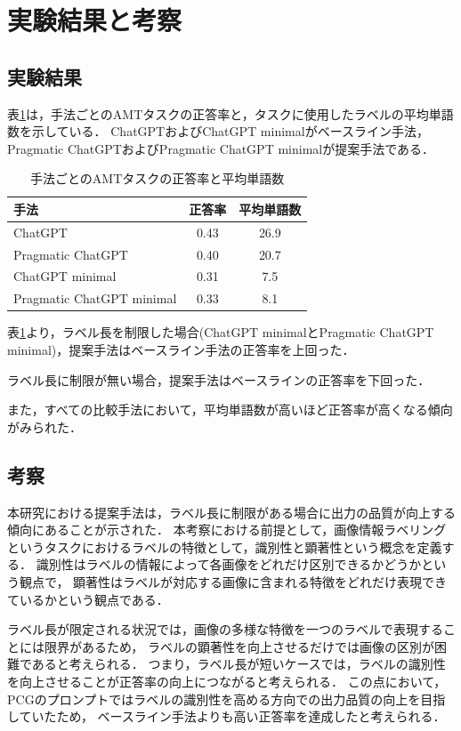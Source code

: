 \documentclass[a4paper,11pt]{jreport}
\begin{document}
\section{実験結果と考察}

\subsection{実験結果}

表\ref{tab:accuracy_result}は，手法ごとのAMTタスクの正答率と，タスクに使用したラベルの平均単語数を示している．
ChatGPTおよびChatGPT minimalがベースライン手法，Pragmatic ChatGPTおよびPragmatic ChatGPT minimalが提案手法である．

\begin{table}[H]
\centering
\begin{tabular}{lcc}
\hline
手法 & 正答率 & 平均単語数 \\
\hline
ChatGPT & 0.43 & 26.9 \\
Pragmatic ChatGPT & 0.40 & 20.7 \\
ChatGPT minimal & 0.31 & 7.5 \\
Pragmatic ChatGPT minimal & 0.33 & 8.1 \\
\hline
\end{tabular}
\caption{手法ごとのAMTタスクの正答率と平均単語数}
\label{tab:accuracy_result}
\end{table}

表\ref{tab:accuracy_result}より，ラベル長を制限した場合(ChatGPT minimalとPragmatic ChatGPT minimal)，提案手法はベースライン手法の正答率を上回った．

ラベル長に制限が無い場合，提案手法はベースラインの正答率を下回った．

また，すべての比較手法において，平均単語数が高いほど正答率が高くなる傾向がみられた．

\subsection{考察}
本研究における提案手法は，ラベル長に制限がある場合に出力の品質が向上する傾向にあることが示された．
本考察における前提として，画像情報ラベリングというタスクにおけるラベルの特徴として，識別性と顕著性という概念を定義する．
識別性はラベルの情報によって各画像をどれだけ区別できるかどうかという観点で，
顕著性はラベルが対応する画像に含まれる特徴をどれだけ表現できているかという観点である．

ラベル長が限定される状況では，画像の多様な特徴を一つのラベルで表現することには限界があるため，
ラベルの顕著性を向上させるだけでは画像の区別が困難であると考えられる．
つまり，ラベル長が短いケースでは，ラベルの識別性を向上させることが正答率の向上につながると考えられる．
この点において，PCGのプロンプトではラベルの識別性を高める方向での出力品質の向上を目指していたため，
ベースライン手法よりも高い正答率を達成したと考えられる．
\end{document}
